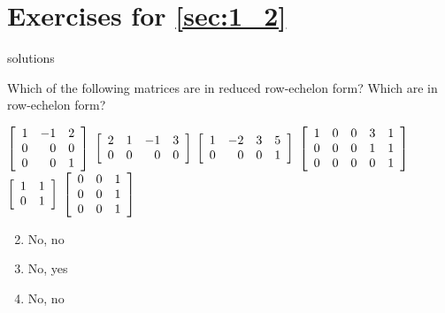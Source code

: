\section*{Exercises for \ref{sec:1_2}}

\begin{Filesave}{solutions}
\end{Filesave}

\begin{multicols}{2}
\begin{ex}
	\label{ex:1_2_1}
Which of the following matrices are in reduced row-echelon form? Which are in row-echelon form?

\begin{exenumerate}
\exitem 
$\left[ \begin{array}{rrr}
	1 & -1 & 2 \\
	0 &  0 & 0 \\
	0 &  0 & 1		
\end{array} \right]$
\exitem 
$\left[ \begin{array}{rrrr}
	2 & 1 & -1 & 3 \\
	0 & 0 &  0 & 0
\end{array} \right]$
\exitem 
$\left[ \begin{array}{rrrr}
1 & -2 & 3 & 5 \\
0 & 0 &  0 & 1
\end{array} \right]$
\exitem 
$\left[ \begin{array}{rrrrr}
	1 & 0 & 0 & 3 & 1\\
	0 & 0 & 0 & 1 & 1 \\
	0 & 0 & 0 & 0 & 1
\end{array} \right]$
\exitem
$\left[ \begin{array}{rr}
	1 & 1 \\
	0 & 1		
\end{array} \right]$
\exitem 
$\left[ \begin{array}{rrr}
	0 &  0 & 1 \\
	0 &  0 & 1 \\
	0 &  0 & 1		
\end{array} \right]$
\end{exenumerate}

\begin{sol}
\begin{enumerate}[label={\alph*.}]
\setcounter{enumi}{1}
\item  No, no
\setcounter{enumi}{3}
\item  No, yes
\setcounter{enumi}{5}
\item  No, no
\end{enumerate}
\end{sol}
\end{ex}


\end{multicols}
